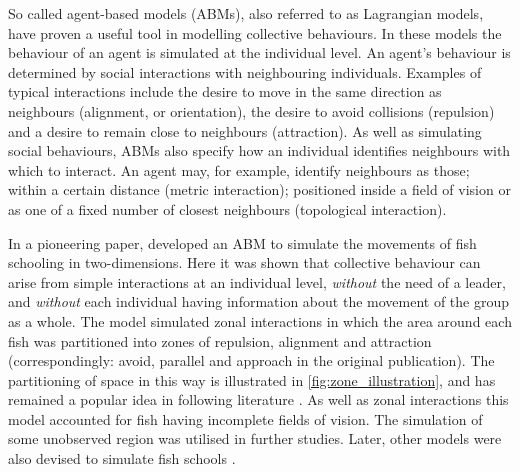So called agent-based models (ABMs), also referred to as Lagrangian models,
have proven a useful tool in modelling collective behaviours. In these models
the behaviour of an agent is simulated at the individual level. An agent's
behaviour is determined by social interactions with neighbouring individuals.
Examples of typical interactions include the desire to move in the same
direction as neighbours (alignment, or orientation), the desire to avoid
collisions (repulsion) and a desire to remain close to neighbours (attraction).
As well as simulating social behaviours, ABMs also specify how an individual
identifies neighbours with which to interact. An agent may, for example,
identify neighbours as those; within a certain distance (metric interaction);
positioned inside a field of vision or as one of a fixed number of closest
neighbours (topological interaction).

In a pioneering paper, \textcite{aoki82} developed an ABM to simulate the
movements of fish schooling in two-dimensions. Here it was shown that
collective behaviour can arise from simple interactions at an individual level,
\emph{without} the need of a leader, and \emph{without} each individual having
information about the movement of the group as a whole. The model simulated
zonal interactions in which the area around each fish was partitioned into
zones of repulsion, alignment and attraction (correspondingly: avoid, parallel
and approach in the original publication). The partitioning of space in this
way is illustrated in \cref{fig:zone_illustration}, and has remained a popular
idea in following literature \parencite{huth92, vicsek95, couzin02, couzin05}.
As well as zonal interactions this model accounted for fish having incomplete
fields of vision. The simulation of some unobserved region was utilised in
further studies. Later, other models were also devised to simulate fish schools
\parencite{okubo86, huth92}.

